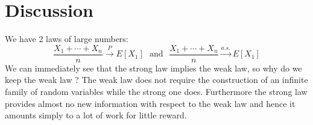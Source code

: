 \documentclass[10pt,a4paper]{book}
\theoremstyle{definition}
\begin{document}
\section{Discussion}

We have 2 laws of large numbers:
\[
\frac{X_1 + \cdots + X_n}{n} \stackrel{P}{\longrightarrow} E[X_1] \mbox{~~and~~} \frac{X_1 + \cdots + X_n}{n} \stackrel{a.s.}{\longrightarrow} E[X_1]
\]
We can immediately see that the strong law implies the weak law, so why do we keep the weak law ? The weak law does not require the construction of an infinite family of random variables while the strong one does. Furthermore the strong law provides almost no new information with respect to the weak law and hence it amounts simply to a lot of work for little reward.
\end{document}
